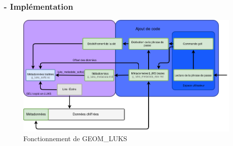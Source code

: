 \begin{frame}
	\frametitle{\insertsubsectionhead{} - Implémentation}
	\begin{figure}
		\includegraphics[width=\textwidth]{developpement/utilisation_metadonnee_luks_2}
		\caption{Fonctionnement de GEOM\_LUKS}
	\end{figure}
\end{frame}
